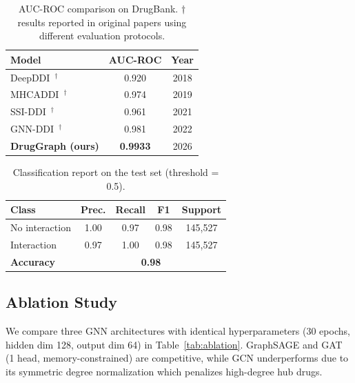 \documentclass[10pt,twocolumn]{article}
\begin{document}
\begin{table}[H]
\centering
\small
\caption{AUC-ROC comparison on DrugBank. $\dagger$ results reported in original papers using different evaluation protocols.}
\label{tab:baselines}
\begin{tabular}{lcc}
\toprule
\textbf{Model} & \textbf{AUC-ROC} & \textbf{Year} \\
\midrule
DeepDDI~\cite{ryu2018}$^\dagger$       & 0.920 & 2018 \\
MHCADDI~\cite{deac2019}$^\dagger$      & 0.974 & 2019 \\
SSI-DDI~\cite{nyamabo2021}$^\dagger$   & 0.961 & 2021 \\
GNN-DDI~\cite{peng2022}$^\dagger$      & 0.981 & 2022 \\
\midrule
\textbf{DrugGraph (ours)}              & \textbf{0.9933} & 2026 \\
\bottomrule
\end{tabular}
\end{table}

\begin{table}[H]
\centering
\small
\caption{Classification report on the test set (threshold = 0.5).}
\label{tab:classification}
\begin{tabular}{lcccc}
\toprule
\textbf{Class} & \textbf{Prec.} & \textbf{Recall} & \textbf{F1} & \textbf{Support} \\
\midrule
No interaction  & 1.00 & 0.97 & 0.98 & 145,527 \\
Interaction     & 0.97 & 1.00 & 0.98 & 145,527 \\
\midrule
\textbf{Accuracy}  & \multicolumn{4}{c}{\textbf{0.98}} \\
\bottomrule
\end{tabular}
\end{table}

\subsection{Ablation Study}

We compare three GNN architectures with identical hyperparameters (30 epochs,
hidden dim 128, output dim 64) in Table~\ref{tab:ablation}. GraphSAGE and GAT
(1 head, memory-constrained) are competitive, while GCN underperforms due to its
symmetric degree normalization which penalizes high-degree hub drugs.
\end{document}
